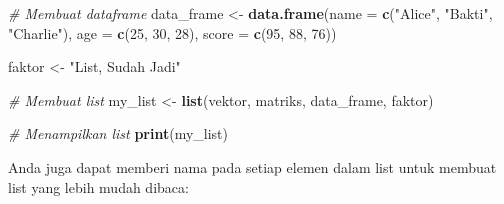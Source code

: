\documentclass[
]{book}
\newenvironment{Shaded}{\begin{snugshade}}{\end{snugshade}}
\newcommand{\AttributeTok}[1]{\textcolor[rgb]{0.13,0.29,0.53}{#1}}
\newcommand{\CommentTok}[1]{\textcolor[rgb]{0.56,0.35,0.01}{\textit{#1}}}
\newcommand{\DecValTok}[1]{\textcolor[rgb]{0.00,0.00,0.81}{#1}}
\newcommand{\FunctionTok}[1]{\textcolor[rgb]{0.13,0.29,0.53}{\textbf{#1}}}
\newcommand{\NormalTok}[1]{#1}
\newcommand{\OtherTok}[1]{\textcolor[rgb]{0.56,0.35,0.01}{#1}}
\newcommand{\SpecialCharTok}[1]{\textcolor[rgb]{0.81,0.36,0.00}{\textbf{#1}}}
\newcommand{\StringTok}[1]{\textcolor[rgb]{0.31,0.60,0.02}{#1}}
\begin{document}
\begin{Shaded}
\begin{Highlighting}[]
\CommentTok{\# Membuat dataframe}
\NormalTok{data\_frame }\OtherTok{\textless{}{-}} \FunctionTok{data.frame}\NormalTok{(}\AttributeTok{name =} \FunctionTok{c}\NormalTok{(}\StringTok{"Alice"}\NormalTok{, }\StringTok{"Bakti"}\NormalTok{, }\StringTok{"Charlie"}\NormalTok{),}
                         \AttributeTok{age =} \FunctionTok{c}\NormalTok{(}\DecValTok{25}\NormalTok{, }\DecValTok{30}\NormalTok{, }\DecValTok{28}\NormalTok{),}
                         \AttributeTok{score =} \FunctionTok{c}\NormalTok{(}\DecValTok{95}\NormalTok{, }\DecValTok{88}\NormalTok{, }\DecValTok{76}\NormalTok{))}
\end{Highlighting}
\end{Shaded}

\begin{Shaded}
\begin{Highlighting}[]
\NormalTok{faktor }\OtherTok{\textless{}{-}} \StringTok{"List, Sudah Jadi"}
\end{Highlighting}
\end{Shaded}

\begin{Shaded}
\begin{Highlighting}[]
\CommentTok{\# Membuat list}
\NormalTok{my\_list }\OtherTok{\textless{}{-}} \FunctionTok{list}\NormalTok{(vektor, matriks, data\_frame, faktor)}
\end{Highlighting}
\end{Shaded}

\begin{Shaded}
\begin{Highlighting}[]
\CommentTok{\# Menampilkan list}
\FunctionTok{print}\NormalTok{(my\_list)}
\end{Highlighting}
\end{Shaded}

Anda juga dapat memberi nama pada setiap elemen dalam list untuk membuat list yang lebih mudah dibaca:

\begin{Shaded}
\end{Shaded}
\end{document}

